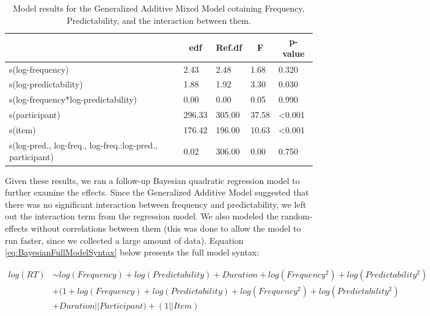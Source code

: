 \documentclass[
  man,floatsintext]{apa6}
\begin{document}
\begin{table}[H]

\begin{center}
\begin{threeparttable}

\caption{\label{tab:gamModelInterTab}Model results for the Generalized Additive Mixed Model cotaining Frequency, Predictability, and the interaction between them.}

\begin{tabular}{lllll}
\toprule
 & \multicolumn{1}{c}{edf} & \multicolumn{1}{c}{Ref.df} & \multicolumn{1}{c}{F} & \multicolumn{1}{c}{p-value}\\
\midrule
s(log-frequency) & 2.43 & 2.48 & 1.68 & 0.320\\
s(log-predictability) & 1.88 & 1.92 & 3.30 & 0.030\\
s(log-frequency*log-predictability) & 0.00 & 0.00 & 0.05 & 0.990\\
s(participant) & 296.33 & 305.00 & 37.58 & <0.001\\
s(item) & 176.42 & 196.00 & 10.63 & <0.001\\
s(log-pred., log-freq., log-freq.:log-pred., participant) & 0.02 & 306.00 & 0.00 & 0.750\\
\bottomrule
\end{tabular}

\end{threeparttable}
\end{center}

\end{table}

Given these results, we ran a follow-up Bayesian quadratic regression model to further examine the effects. Since the Generalized Additive Model suggested that there was no significant interaction between frequency and predictability, we left out the interaction term from the regression model. We also modeled the random-effects without correlations between them (this was done to allow the model to run faster, since we collected a large amount of data). Equation \eqref{eq:BayesianFullModelSyntax} below presents the full model syntax:

\begin{equation}
\begin{aligned}
\label{eq:BayesianFullModelSyntax}
log(RT) & \sim  log(Frequency) + log(Predictability) + Duration + log(Frequency^2)  
+ log(Predictability^2) \\ 
& + (1 + log(Frequency) + log(Predictability) + log(Frequency^2) + log(Predictability^2) \\
& + Duration || Participant) + (1 || Item)
\end{aligned}
\end{equation}
\end{document}
